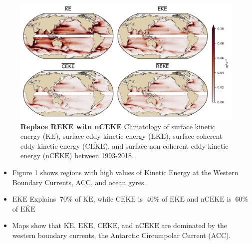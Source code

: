 \documentclass[draft]{agujournal2019}
\newcommand{\MKE}{\overline{\textrm{KE}}}
\newcommand{\MEKE}{\overline{\textrm{EKE}}}
\newcommand{\MCEKE}{\overline{\textrm{CEKE}}}
\newcommand{\MnCEKE}{\overline{\textrm{nCEKE}}}
\begin{document}
	\begin{figure}
	    \centering
	    \includegraphics[width=1\textwidth]{figures/mean_ke_maps.pdf}
	    \caption{\textbf{Replace REKE witn nCEKE} Climatology of surface kinetic energy ($\MKE$), surface eddy kinetic energy ($\MEKE$), surface coherent eddy kinetic energy ($\MCEKE$), and surface non-coherent eddy kinetic energy ($\MnCEKE$) between 1993-2018.}
	    \label{fig:my_label}
	\end{figure}
	

	\begin{itemize}
		\item Figure 1 shows regions with high values of Kinetic Energy at the Western Boundary Currents, ACC, and ocean gyres. 
		\item $\MEKE$ Explains $~70\%$ of $\MKE$, while $\MCEKE$ is $~40\%$ of $\MEKE$ and $\MnCEKE$  is $~60\%$ of $\MEKE$ 
		\item Maps show that $\MKE$, $\MEKE$, $\MCEKE$, and $\MnCEKE$ are dominated by the western boundary currents, the Antarctic Circumpolar Current (ACC).
	\end{itemize}
	
\end{document}
